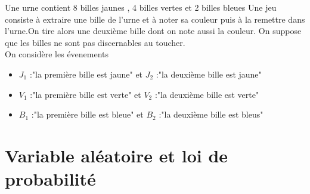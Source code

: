 \documentclass[10pt,a4paper]{article}
\theoremstyle{break}
\begin{document}
	
Une urne contient 8 billes jaunes , 4 billes vertes et 2 billes
bleues
Une jeu consiste à extraire une
bille de l’urne et à noter sa couleur puis à la  remettre dans l'urne.On tire alors une deuxième bille dont on note aussi la couleur. On suppose que les billes ne sont pas discernables au toucher.\\
On considère les évenements \begin{itemize}
	\item  $J_1$ :"la première bille est jaune" et $J_2$ :"la deuxième bille est jaune" 
	\item $V_1$ :"la première bille est verte" et $V_2$ :"la deuxième bille est verte" 
	\item  $B_1$ :"la première bille est bleue" et $B_2$ :"la deuxième bille est bleus"
\end{itemize}
\section{Variable aléatoire et loi de probabilité}
\end{document}
